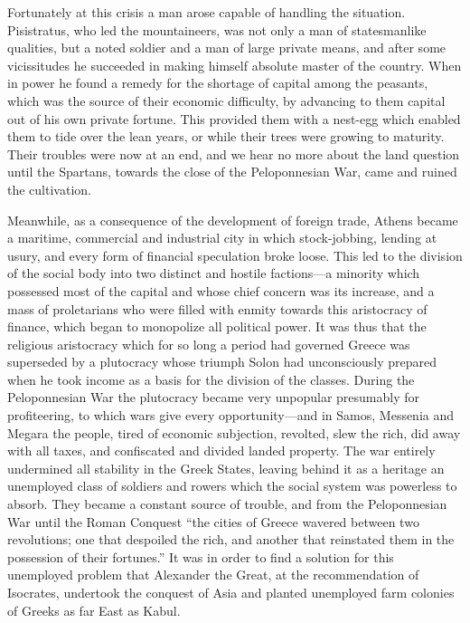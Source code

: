 \documentclass{book}
\begin{document}
Fortunately at this crisis a man arose capable of handling the situation. Pisistratus, who led the mountaineers, was not only a man of statesmanlike qualities, but a noted soldier and a man of large private means, and after some vicissitudes he succeeded in making himself absolute master of the country. When in power he found a remedy for the shortage of capital among the peasants, which was the source of their economic difficulty, by advancing to them capital out of his own private fortune. This provided them with a nest-egg which enabled them to tide over the lean years, or while their trees were growing to maturity. Their troubles were now at an end, and we hear no more about the land question until the Spartans, towards the close of the Peloponnesian War, came and ruined the cultivation.

Meanwhile, as a consequence of the development of foreign trade, Athens became a maritime, commercial and industrial city in which stock-jobbing, lending at usury, and every form of financial speculation broke loose. This led to the division of the social body into two distinct and hostile factions—a minority which possessed most of the capital and whose chief concern was its increase, and a mass of proletarians who were filled with enmity towards this aristocracy of finance, which began to monopolize all political power. It was thus that the religious aristocracy which for so long a period had governed Greece was superseded by a plutocracy whose triumph Solon had unconsciously prepared when he took income as a basis for the division of the classes. During the Peloponnesian War the plutocracy became very unpopular presumably for profiteering, to which wars give every opportunity—and in Samos, Messenia and Megara the people, tired of economic subjection, revolted, slew the rich, did away with all taxes, and confiscated and divided landed property. The war entirely undermined all stability in the Greek States, leaving behind it as a heritage an unemployed class of soldiers and rowers which the social system was powerless to absorb. They became a constant source of trouble, and from the Peloponnesian War until the Roman Conquest “the cities of Greece wavered between two revolutions; one that despoiled the rich, and another that reinstated them in the possession of their fortunes.” It was in order to find a solution for this unemployed problem that Alexander the Great, at the recommendation of Isocrates, undertook the conquest of Asia and planted unemployed farm colonies of Greeks as far East as Kabul.\footnotemark[3]
\end{document}
